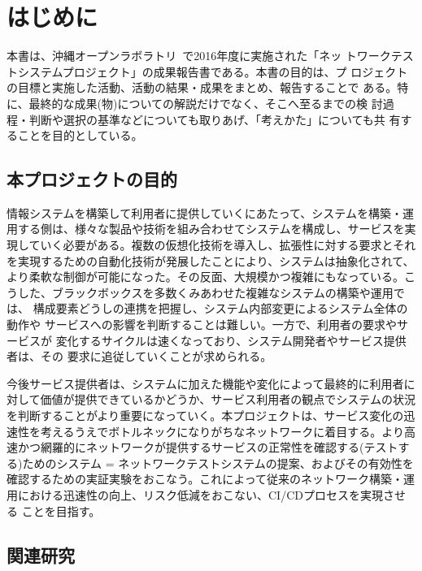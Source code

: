 
\chapter{はじめに}
\label{chap:abstract}

本書は、沖縄オープンラボラトリ~\cite{ool-web}で2016年度に実施された「ネッ
トワークテストシステムプロジェクト」の成果報告書である。本書の目的は、プ
ロジェクトの目標と実施した活動、活動の結果・成果をまとめ、報告することで
ある。特に、最終的な成果(物)についての解説だけでなく、そこへ至るまでの検
討過程・判断や選択の基準などについても取りあげ、「考えかた」についても共
有することを目的としている。

 \section{本プロジェクトの目的}
 \label{sec:pj-purpose}


情報システムを構築して利用者に提供していくにあたって、システムを構築・運
用する側は、様々な製品や技術を組み合わせてシステムを構成し、サービスを実
現していく必要がある。複数の仮想化技術を導入し、拡張性に対する要求とそれ
を実現するための自動化技術が発展したことにより、システムは抽象化されて、
より柔軟な制御が可能になった。その反面、大規模かつ複雑にもなっている。こ
うした、ブラックボックスを多数くみあわせた複雑なシステムの構築や運用では、
構成要素どうしの連携を把握し、システム内部変更によるシステム全体の動作や
サービスへの影響を判断することは難しい。一方で、利用者の要求やサービスが
変化するサイクルは速くなっており、システム開発者やサービス提供者は、その
要求に追従していくことが求められる。

今後サービス提供者は、システムに加えた機能や変化によって最終的に利用者に
対して価値が提供できているかどうか、サービス利用者の観点でシステムの状況
を判断することがより重要になっていく。本プロジェクトは、サービス変化の迅
速性を考えるうえでボトルネックになりがちなネットワークに着目する。より高
速かつ網羅的にネットワークが提供するサービスの正常性を確認する(テストす
る)ためのシステム = ネットワークテストシステムの提案、およびその有効性を
確認するための実証実験をおこなう。これによって従来のネットワーク構築・運
用における迅速性の向上、リスク低減をおこない、CI/CDプロセスを実現させる
ことを目指す。

 \section{関連研究}
 \label{sec:related-research}

